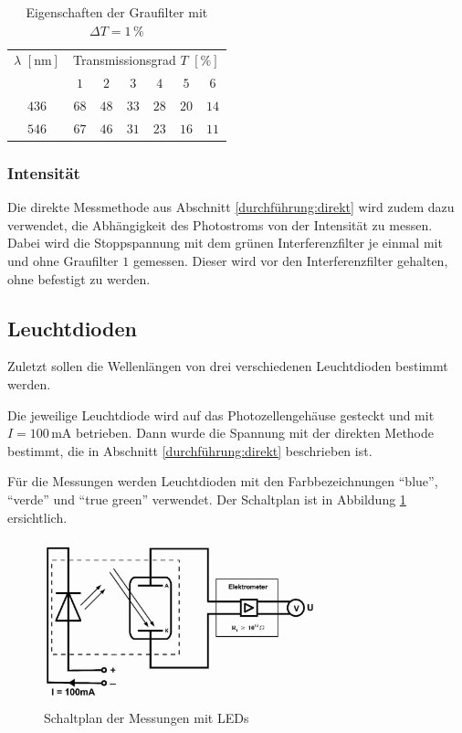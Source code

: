 \documentclass[12pt,a4paper]{scrartcl}
\numberwithin{equation}{section} %
\begin{document}
\begin{table}[h!]
	\centering
	\begin{tabular}{c|c|c|c|c|c|c}
		$\lambda$ $[\mathrm{nm}]$ & \multicolumn{6}{c}{Transmissionsgrad $T$ $[\%]$} \\
		& $1$ & $2$ & $3$ & $4$ & $5$ & $6$ \\
		\hline
		$436$ & $68$ & $48$ & $33$ & $28$ & $20$ & $14$ \\
		$546$ & $67$ & $46$ & $31$ & $23$ & $16$ & $11$
	\end{tabular}
	\caption{Eigenschaften der Graufilter mit $\Delta T=1\,\%$}
	\label{tab:Graufilter}
\end{table}

\subsubsection{Intensität}
Die direkte Messmethode aus Abschnitt \ref{durchführung:direkt} wird zudem dazu verwendet, die Abhängigkeit des Photostroms von der Intensität zu messen. Dabei wird die Stoppspannung mit dem grünen Interferenzfilter je einmal mit und ohne Graufilter $1$ gemessen. Dieser wird vor den Interferenzfilter gehalten, ohne befestigt zu werden.

\subsection{Leuchtdioden}

Zuletzt sollen die Wellenlängen von drei verschiedenen Leuchtdioden bestimmt werden.

Die jeweilige Leuchtdiode wird auf das Photozellengehäuse gesteckt und mit $I=100\mathrm{\,mA}$ betrieben. Dann wurde die Spannung mit der direkten Methode bestimmt, die in Abschnitt \ref{durchführung:direkt} beschrieben ist.

Für die Messungen werden Leuchtdioden mit den Farbbezeichnungen ``blue'', ``verde'' und ``true green'' verwendet. Der Schaltplan ist in Abbildung \ref{fig:Schaltplan LEDs} ersichtlich.

\begin{figure}[h!]
	\centering
	\includegraphics[width=0.7\textwidth]{../media/B1.4/Schaltplan_LED.jpg}
	\caption{Schaltplan der Messungen mit LEDs}
	\label{fig:Schaltplan LEDs}
\end{figure}
\end{document}
